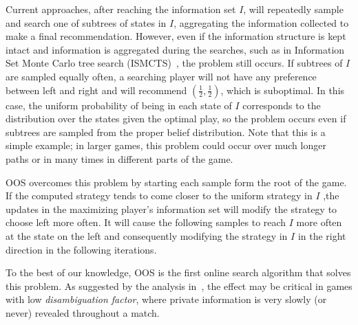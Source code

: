 \documentclass{aamas2015}
\newcommand{\ttm}{\mathtt{m}}
\begin{document}
Current approaches, after reaching the information set $I$, will repeatedly sample and search one of subtrees of states in $I$, aggregating the information collected to make a final recommendation.
However, even if the information structure is kept intact and information is aggregated during the searches, such as in Information Set Monte Carlo tree search (ISMCTS)~\cite{Cowling12ISMCTS}, the problem still occurs. If subtrees of $I$ are sampled equally often, a searching player will not have any preference between left and right and will recommend $(\frac{1}{2},\frac{1}{2})$, which is suboptimal.
In this case, the uniform probability of being in each state of $I$ corresponds to the distribution over the states given the optimal play, so the problem occurs even if subtrees are sampled from the proper belief distribution. 
Note that this is a simple example; in larger games, this problem could occur over much longer paths or in many times in different parts of the game.

OOS overcomes this problem by starting each sample form the root of the game. If the computed strategy tends to come closer to the uniform strategy in $I$ ,the updates in the maximizing player's information set will modify the strategy to choose left more often. It will cause the following samples to reach $I$ more often at the state on the left and consequently modifying the strategy in $I$ in the right direction in the following iterations.

To the best of our knowledge, OOS is the first online search algorithm that solves this problem. As suggested by the analysis in~\cite{Long10Understanding}, the effect may be critical in games with low {\it disambiguation factor}, where private information is very slowly (or never) revealed throughout a match.
\end{document}
